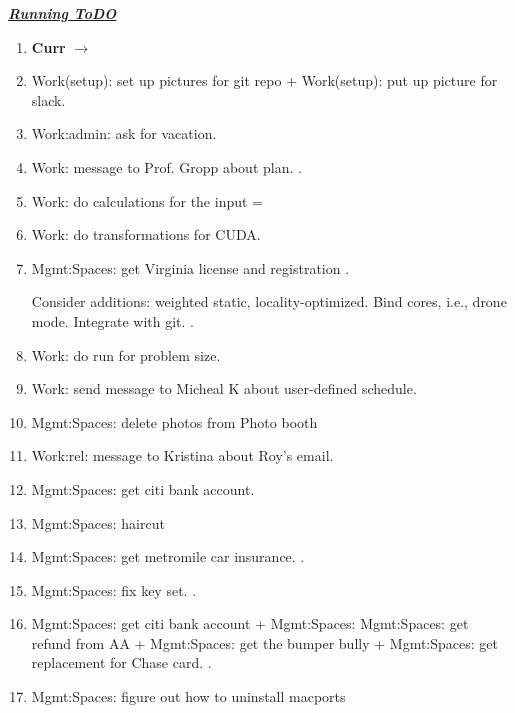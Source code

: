        \underline{\bf \it Running ToDO} \\
        \begin{enumerate}
          

           
          \small \item \small \textbf{Curr} $\rightarrow$
        \item \small Work(setup): set up pictures for git repo + Work(setup): put up picture for slack. 
          
        \item \small Work:admin: ask for vacation.   

        \item \small Work: message to Prof. Gropp about plan.   . 
        \item \small Work: do calculations for the input =   
        \item \small Work: do transformations for CUDA.  

        \item \small Mgmt:Spaces: get Virginia license and registration . 

          \oitem           Consider additions: weighted static, locality-optimized. Bind
          cores, i.e., drone mode. Integrate with git.  
           . 

        \item \small Work: do run for problem size.  
        \item \small Work: send message to Micheal K about user-defined
          schedule.  


        \item \small Mgmt:Spaces: delete photos from Photo booth  
      
        \item \tiny Work:rel: message to Kristina about Roy's email.   
        \item \small Mgmt:Spaces: get citi bank account.  
        \item \small Mgmt:Spaces: haircut  
        \item \small Mgmt:Spaces: get metromile car insurance.   . 
        \item \small Mgmt:Spaces: fix key set. . 
        \item \small Mgmt:Spaces: get citi bank account +  Mgmt:Spaces:
          Mgmt:Spaces: get refund from AA  + Mgmt:Spaces: get the
          bumper bully +  Mgmt:Spaces: get replacement for Chase card. .
          \item \small Mgmt:Spaces: figure out how to uninstall macports 
 

\end{enumerate}
